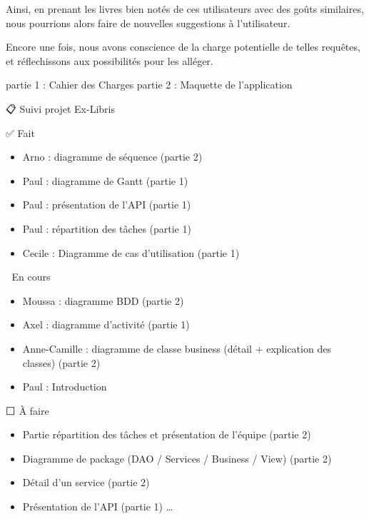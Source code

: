 \documentclass[
  letterpaper,
  DIV=11,
  numbers=noendperiod]{scrartcl}
\providecommand{\tightlist}{%
  \setlength{\itemsep}{0pt}\setlength{\parskip}{0pt}}
\begin{document}
Ainsi, en prenant les livres bien notés de ces utilisateurs avec des
goûts similaires, nous pourrions alors faire de nouvelles suggestions à
l'utilisateur.

Encore une fois, nous avons conscience de la charge potentielle de
telles requêtes, et réflechissons aux possibilités pour les alléger.

\newpage

partie 1 : Cahier des Charges partie 2 : Maquette de l'application

📋 Suivi projet Ex-Libris

✅ Fait

\begin{itemize}
\tightlist
\item
  Arno : diagramme de séquence (partie 2)
\item
  Paul : diagramme de Gantt (partie 1)
\item
  Paul : présentation de l'API (partie 1)
\item
  Paul : répartition des tâches (partie 1)
\item
  Cecile : Diagramme de cas d'utilisation (partie 1)
\end{itemize}

🔄 En cours

\begin{itemize}
\tightlist
\item
  Moussa : diagramme BDD (partie 2)
\item
  Axel : diagramme d'activité (partie 1)
\item
  Anne-Camille : diagramme de classe business (détail + explication des
  classes) (partie 2)
\item
  Paul : Introduction
\end{itemize}

⬜ À faire

\begin{itemize}
\tightlist
\item
  Partie répartition des tâches et présentation de l'équipe (partie 2)
\item
  Diagramme de package (DAO / Services / Business / View) (partie 2)
\item
  Détail d'un service (partie 2)
\item
  Présentation de l'API (partie 1) \ldots{}
\end{itemize}
\end{document}
